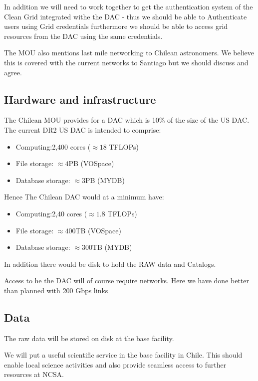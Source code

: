 In addition we will need to work together to get the authentication system of the Clean Grid integrated withe the DAC - thus we should be able to Authenticate users using Grid credentials furthermore we should be able to access grid resources from the DAC using the same credentials.

The MOU also mentions last mile networking to Chilean astronomers. We believe this is covered with the current networks to Santiago but we should discuss and agree.

\subsection{Hardware and infrastructure}
The Chilean MOU provides for a DAC which is 10\% of the size of the US DAC. The current DR2 US DAC is intended to comprise:
\begin{itemize}
\item Computing:2,400 cores ($\approx 18$ TFLOPs)
\item File storage: $\approx 4 $PB  (VOSpace)
\item Database storage: $\approx 3 $PB (MYDB)

\end{itemize}

Hence The Chilean DAC would at a minimum have:
\begin{itemize}
\item Computing:2,40 cores ($\approx 1.8$ TFLOPs)
\item File storage: $\approx 400 $TB  (VOSpace)
\item Database storage: $\approx 300 $TB (MYDB)

\end{itemize}

In addition there would be disk to hold the RAW data and Catalogs.

Access to he the DAC will of course require networks. Here we have done better than planned with 200 Gbps links


\subsection{Data }

The raw data will be stored on disk at the base facility.



We will put a useful scientific service in the base facility in Chile. This should enable local science activities and also provide seamless access to further resources at NCSA.
